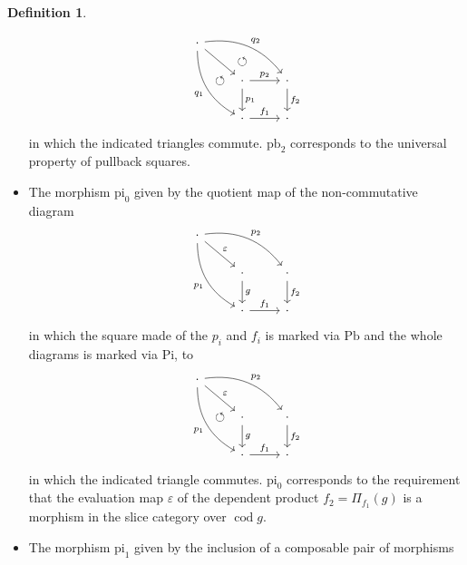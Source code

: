 \documentclass[a4paper]{article}
\theoremstyle{remark}
\theoremstyle{definition}
\newtheorem{definition}[theorem]{Definition}
\begin{document}
\begin{definition}
\begin{itemize}
\begin{equation}
        \begin{tikzcd}
          \cdot \arrow[ddr, bend right, "q_1"'] \arrow[ddr, phantom, "\circlearrowleft"] \arrow[drr, bend left, "q_2"] \arrow[drr, phantom, "\circlearrowleft"] \arrow[dr] \\
          & \cdot \arrow[d, "p_1"] \arrow[r, "p_2"] & \cdot \arrow[d, "f_2"] \\
          & \cdot \arrow[r, "f_1"] & \cdot
        \end{tikzcd}
      \end{equation}
      in which the indicated triangles commute.
      $\mathrm{pb}_2$ corresponds to the universal property of pullback squares.
    \item
      The morphism $\mathrm{pi}_0$ given by the quotient map of the non-commutative diagram
      \begin{equation}
        \begin{tikzcd}
          \cdot \arrow[ddr, bend right, "p_1"'] \arrow[drr, bend left, "p_2"] \arrow[dr, "\varepsilon"] \\
          & \cdot \arrow[d, "g"] & \cdot \arrow[d, "f_2"] \\
          & \cdot \arrow[r, "f_1"] & \cdot
        \end{tikzcd}
      \end{equation}
      in which the square made of the $p_i$ and $f_i$ is marked via $\mathrm{Pb}$ and the whole diagrams is marked via $\mathrm{Pi}$, to
      \begin{equation}
        \begin{tikzcd}
          \cdot \arrow[ddr, bend right, "p_1"'] \arrow[ddr, phantom, "\circlearrowleft"] \arrow[drr, bend left, "p_2"] \arrow[dr, "\varepsilon"] \\
          & \cdot \arrow[d, "g"] & \cdot \arrow[d, "f_2"] \\
          & \cdot \arrow[r, "f_1"] & \cdot
        \end{tikzcd}
      \end{equation}
      in which the indicated triangle commutes.
      $\mathrm{pi}_0$ corresponds to the requirement that the evaluation map $\varepsilon$ of the dependent product $f_2 = \Pi_{f_1}(g)$ is a morphism in the slice category over $\operatorname{cod} g$.
    \item
      The morphism $\mathrm{pi}_1$ given by the inclusion of a composable pair of morphisms
      \begin{equation}
        \begin{tikzcd}

\end{tikzcd}
\end{equation}
\end{itemize}
\end{definition}
\end{document}

